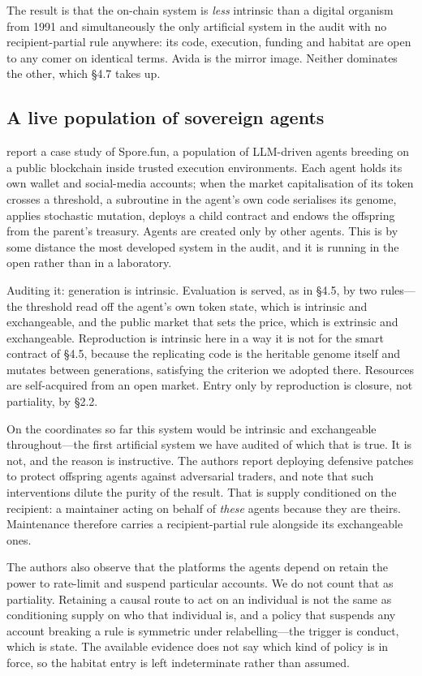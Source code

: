 \documentclass[review,3p,times]{elsarticle}
\begin{document}
The result is that the on-chain system is \emph{less} intrinsic than a digital
organism from 1991 and simultaneously the only artificial system in the audit
with no recipient-partial rule anywhere: its code, execution, funding and
habitat are open to any comer on identical terms. Avida is the mirror image.
Neither dominates the other, which \S4.7 takes up.

\subsection{A live population of sovereign agents}

\citet{hurong2025} report a case study of Spore.fun, a population of
LLM-driven agents breeding on a public blockchain inside trusted execution
environments. Each agent holds its own wallet and social-media accounts;
when the market capitalisation of its token crosses a threshold, a
subroutine in the agent's own code serialises its genome, applies
stochastic mutation, deploys a child contract and endows the offspring from
the parent's treasury. Agents are created only by other agents. This is by
some distance the most developed system in the audit, and it is running in
the open rather than in a laboratory.

Auditing it: generation is intrinsic. Evaluation is served, as in \S4.5, by
two rules---the threshold read off the agent's own token state, which is
intrinsic and exchangeable, and the public market that sets the price,
which is extrinsic and exchangeable. Reproduction is intrinsic here in a
way it is not for the smart contract of \S4.5, because the replicating code
is the heritable genome itself and mutates between generations, satisfying
the criterion we adopted there. Resources are self-acquired from an open
market. Entry only by reproduction is closure, not partiality, by \S2.2.

On the coordinates so far this system would be intrinsic and exchangeable
throughout---the first artificial system we have audited of which that is
true. It is not, and the reason is instructive. The authors report deploying
defensive patches to protect offspring agents against adversarial traders,
and note that such interventions dilute the purity of the result. That is
supply conditioned on the recipient: a maintainer acting on behalf of
\emph{these} agents because they are theirs. Maintenance therefore carries a
recipient-partial rule alongside its exchangeable ones.

The authors also observe that the platforms the agents depend on retain the
power to rate-limit and suspend particular accounts. We do not count that as
partiality. Retaining a causal route to act on an individual is not the same
as conditioning supply on who that individual is, and a policy that suspends
any account breaking a rule is symmetric under relabelling---the trigger is
conduct, which is state. The available evidence does not say which kind of
policy is in force, so the habitat entry is left indeterminate rather than
assumed.
\end{document}
